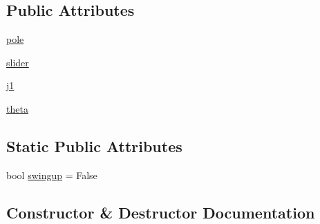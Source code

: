 \subsection*{Public Attributes}
\begin{DoxyCompactItemize}
\item 
\hyperlink{classpybullet-gym_1_1pybulletgym_1_1envs_1_1roboschool_1_1robots_1_1pendula_1_1interted__pendulum_1_1_inverted_pendulum_a1da8446964f05dcf30849165a69a6c1f}{pole}
\item 
\hyperlink{classpybullet-gym_1_1pybulletgym_1_1envs_1_1roboschool_1_1robots_1_1pendula_1_1interted__pendulum_1_1_inverted_pendulum_a43b4cd6dbb15743754620c14a44d4dee}{slider}
\item 
\hyperlink{classpybullet-gym_1_1pybulletgym_1_1envs_1_1roboschool_1_1robots_1_1pendula_1_1interted__pendulum_1_1_inverted_pendulum_a47b6bfdb91bb3edce2c6098bca2325e7}{j1}
\item 
\hyperlink{classpybullet-gym_1_1pybulletgym_1_1envs_1_1roboschool_1_1robots_1_1pendula_1_1interted__pendulum_1_1_inverted_pendulum_a12704b2e28afe563b477ed8f5c1162fb}{theta}
\end{DoxyCompactItemize}
\subsection*{Static Public Attributes}
\begin{DoxyCompactItemize}
\item 
bool \hyperlink{classpybullet-gym_1_1pybulletgym_1_1envs_1_1roboschool_1_1robots_1_1pendula_1_1interted__pendulum_1_1_inverted_pendulum_a750e33fd408bd8eb41e05deffb15ed56}{swingup} = False
\end{DoxyCompactItemize}


\subsection{Constructor \& Destructor Documentation}
